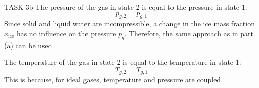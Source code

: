 TASK 3b  
The pressure of the gas in state 2 is equal to the pressure in state 1:  
\[
p_{g,2} = p_{g,1}
\]  
Since solid and liquid water are incompressible, a change in the ice mass fraction \( x_{\text{ice}} \) has no influence on the pressure \( p_g \). Therefore, the same approach as in part (a) can be used.  

The temperature of the gas in state 2 is equal to the temperature in state 1:  
\[
T_{g,2} = T_{g,1}
\]  
This is because, for ideal gases, temperature and pressure are coupled.  
